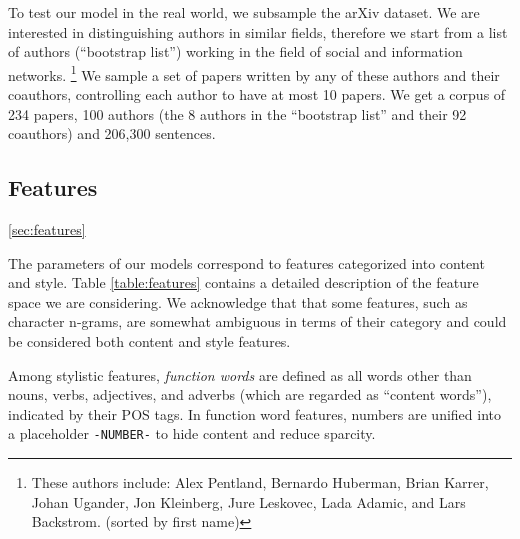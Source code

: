 To test our model in the real world, we subsample the arXiv dataset. We are interested in distinguishing authors in similar fields, therefore we start from a list of authors (``bootstrap list'') working in the field of social and information networks.
\footnote{These authors include: Alex Pentland, Bernardo Huberman, Brian Karrer, Johan Ugander, Jon Kleinberg, Jure Leskovec, Lada Adamic, and Lars Backstrom. (sorted by first name)} 
We sample a set of papers written by any of these authors and their coauthors, controlling each author to have at most 10 papers. We get a corpus of 234 papers, 100 authors (the 8 authors in the ``bootstrap list'' and their 92 coauthors) and 206,300 sentences.


\subsection{Features}\ref{sec:features}

The parameters of our models correspond to features categorized into content and style. Table \ref{table:features} contains a detailed description of the feature space we are considering. We acknowledge that that some features, such as character n-grams, are somewhat ambiguous in terms of their category and could be considered both content and style features.  

Among stylistic features, \textit{function words} are defined as
all words other than nouns, verbs, adjectives, and adverbs (which are
regarded as ``content words''), indicated by their POS tags. In
function word features, numbers are unified into a placeholder
\texttt{-NUMBER-} to hide content and reduce sparcity.

